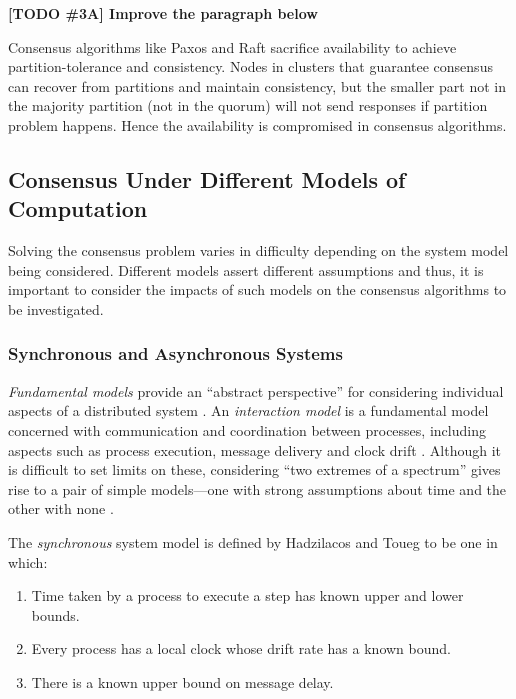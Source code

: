 \documentclass[12pt, a4paper]{article}
\newcommand{\todo}[2]{\textbf{\color{blue}[TODO \##1] #2}\par}
\begin{document}
\todo{3A}{Improve the paragraph below}

Consensus algorithms like Paxos and Raft sacrifice availability to achieve partition-tolerance and consistency. Nodes in clusters that guarantee consensus can recover from partitions and maintain consistency, but the smaller part not in the majority partition (not in the quorum) will not send responses if partition problem happens. Hence the availability is compromised in consensus algorithms.

\subsection{Consensus Under Different Models of Computation} \label{sec:fundamental-models}
Solving the consensus problem varies in difficulty depending on the system model being considered. Different models assert different assumptions and thus, it is important to consider the impacts of such models on the consensus algorithms to be investigated.

\subsubsection{Synchronous and Asynchronous Systems}
\textit{Fundamental models} provide an ``abstract perspective'' for considering individual aspects of a distributed system \cite{coulouris2005distributed}. An \textit{interaction model} is a fundamental model concerned with communication and coordination between processes, including aspects such as process execution, message delivery and clock drift \cite{coulouris2005distributed}. Although it is difficult to set limits on these, considering ``two extremes of a spectrum'' gives rise to a pair of simple models---one with strong assumptions about time and the other with none \cite{coulouris2005distributed, hadzilacos1994modular}.

The \textit{synchronous} system model is defined by Hadzilacos and Toueg \cite{hadzilacos1994modular} to be one in which:

\begin{enumerate}
  \item Time taken by a process to execute a step has known upper and lower
    bounds.
  \item Every process has a local clock whose drift rate has a known bound.
  \item There is a known upper bound on message delay.
\end{enumerate}
\end{document}
